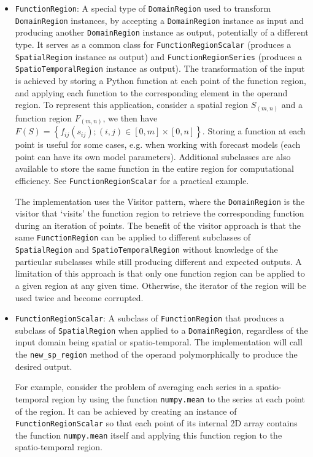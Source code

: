 \begin{itemize}
	\item \texttt{FunctionRegion}: A special type of \texttt{DomainRegion} used to transform \texttt{DomainRegion} instances, by accepting a \texttt{DomainRegion} instance as input and producing another \texttt{DomainRegion} instance as output, potentially of a different type. It serves as a common class for \texttt{FunctionRegionScalar} (produces a \texttt{SpatialRegion} instance as output) and \texttt{FunctionRegionSeries} (produces a \texttt{SpatioTemporalRegion} instance as output). The transformation of the input is achieved by storing a Python function at each point of the function region, and applying each function to the corresponding element in the operand region. To represent this application, consider a spatial region $S_{(m,n)}$ and a function region $F_{(m,n)}$, we then have $F(S) = \left\{ f_{ij}(s_{ij}); (i, j) \in [0, m]\times[0, n] \right\}$. Storing a function at each point is useful for some cases, e.g. when working with forecast models (each point can have its own model parameters). Additional subclasses are also available to store the same function in the entire region for computational efficiency. See \texttt{FunctionRegionScalar} for a practical example.
	
    The implementation uses the Visitor pattern, where the \texttt{DomainRegion} is the visitor that `visits' the function region to retrieve the corresponding function during an iteration of points. The benefit of the visitor approach is that the same \texttt{FunctionRegion} can be applied to different subclasses of \texttt{SpatialRegion} and \texttt{SpatioTemporalRegion} without knowledge of the particular subclasses while still producing different and expected outputs. A limitation of this approach is that only one function region can be applied to a given region at any given time. Otherwise, the iterator of the region will be used twice and become corrupted.
	
	\item \texttt{FunctionRegionScalar}: A subclass of \texttt{FunctionRegion} that produces a subclass of \texttt{SpatialRegion} when applied to a \texttt{DomainRegion}, regardless of the input domain being spatial or spatio-temporal. The implementation will call the \texttt{new\_sp\_region} method of the operand polymorphically to produce the desired output.
	
	For example, consider the problem of averaging each series in a spatio-temporal region by using the function \texttt{numpy.mean} to the series at each point of the region. It can be achieved by creating an instance of \texttt{FunctionRegionScalar} so that each point of its internal 2D array contains the function \texttt{numpy.mean} itself and applying this function region to the spatio-temporal region.
	

\end{itemize}
